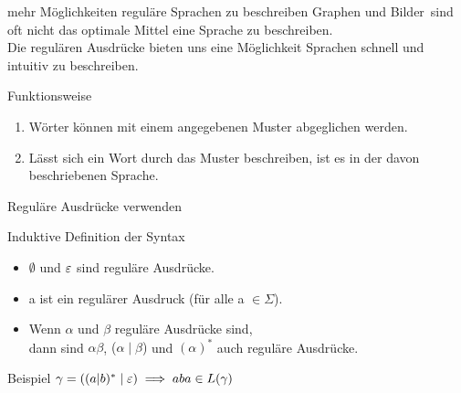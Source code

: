\documentclass[10pt]{beamer}
\begin{document}
\begin{frame}[fragile]{mehr Möglichkeiten reguläre Sprachen zu beschreiben}
Graphen und \glqq Bilder\grqq\ sind oft nicht das optimale Mittel eine Sprache zu beschreiben.\\
Die \alert{regulären Ausdrücke} bieten uns eine Möglichkeit Sprachen schnell und intuitiv zu beschreiben.
\begin{alertblock}{Funktionsweise}
\begin{enumerate}
    \item Wörter können mit einem angegebenen Muster abgeglichen werden.
    \item Lässt sich ein Wort durch das Muster beschreiben, ist es in der davon beschriebenen Sprache. 
\end{enumerate}
\end{alertblock}
\end{frame}

\begin{frame}{Reguläre Ausdrücke verwenden}
    \begin{alertblock}{Induktive Definition der Syntax}
    \begin{itemize}
       \item \alert{$\emptyset$} und \alert{$\varepsilon$} sind reguläre Ausdrücke.
       \item \alert{a} ist ein regulärer Ausdruck (für alle a $\in \Sigma$).
       \item Wenn \alert{$\alpha$} und \alert{$\beta$} reguläre Ausdrücke sind,\\dann sind \alert{$\alpha \beta$}, \alert{($\alpha \mid \beta$)} und \alert{$(\alpha)^*$} auch reguläre Ausdrücke.
   \end{itemize}
   \end{alertblock}
   \begin{exampleblock}{Beispiel}
   $\gamma = ((a|b)^* \mid \varepsilon) \implies aba \in L(\gamma)$
   \end{exampleblock}
\end{frame}
\end{document}

